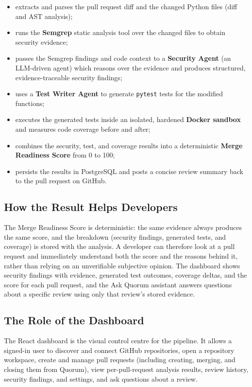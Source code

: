 \begin{itemize}
  \item extracts and parses the pull request diff and the changed Python
        files (diff and AST analysis);
  \item runs the \textbf{Semgrep} static analysis tool over the changed files
        to obtain security evidence;
  \item passes the Semgrep findings and code context to a \textbf{Security
        Agent} (an LLM-driven agent) which reasons over the evidence and
        produces structured, evidence-traceable security findings;
  \item uses a \textbf{Test Writer Agent} to generate \texttt{pytest} tests
        for the modified functions;
  \item executes the generated tests inside an isolated, hardened
        \textbf{Docker sandbox} and measures code coverage before and after;
  \item combines the security, test, and coverage results into a
        deterministic \textbf{Merge Readiness Score} from 0 to 100;
  \item persists the results in PostgreSQL and posts a concise review summary
        back to the pull request on GitHub.
\end{itemize}

\subsection{How the Result Helps Developers}

The Merge Readiness Score is deterministic: the same evidence always produces
the same score, and the breakdown (security findings, generated tests, and
coverage) is stored with the analysis. A developer can therefore look at a
pull request and immediately understand both the score and the reasons behind
it, rather than relying on an unverifiable subjective opinion. The dashboard
shows security findings with evidence, generated test outcomes, coverage
deltas, and the score for each pull request, and the Ask Quorum assistant
answers questions about a specific review using only that review's stored
evidence.

\subsection{The Role of the Dashboard}

The React dashboard is the visual control centre for the pipeline. It allows a
signed-in user to discover and connect GitHub repositories, open a repository
workspace, create and manage pull requests (including creating, merging, and
closing them from Quorum), view per-pull-request analysis results, review
history, security findings, and settings, and ask questions about a review.

